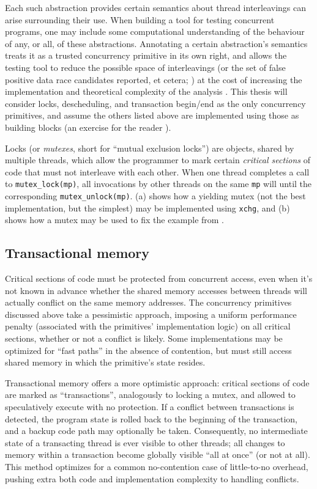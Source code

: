 Each such abstraction provides certain semantics about  thread interleavings can arise surrounding their use.
When building a tool for testing concurrent programs,
one may include some computational understanding of the behaviour of any, or all, of these abstractions.
Annotating a certain abstraction's semantics treats it as a trusted concurrency primitive in its own right,
and allows the testing tool to reduce the possible space of interleavings
(or the set of false positive data race candidates reported, et cetera;
)
at the cost of increasing the implementation and theoretical complexity of the analysis
.
This thesis will consider locks, descheduling, and transaction begin/end as the only concurrency primitives,
and assume the others listed above are implemented using those as building blocks (an exercise for the reader \cite{thrlib}).

Locks (or {\em mutexes}, short for ``mutual exclusion locks'') are objects, shared by multiple threads, which allow the programmer to mark certain {\em critical sections} of code that must not interleave with each other.
When one thread completes a call to {\tt mutex\_lock(mp)}, all invocations by other threads on the same {\tt mp}
will  until the corresponding {\tt mutex\_unlock(mp)}.
(a) shows how a yielding mutex (not the best implementation, but the simplest) may be implemented using {\tt xchg},
and (b) shows how a mutex may be used to fix the example from .


\subsection{Transactional memory}
\label{sec:overview-tm}

Critical sections of code must be protected from concurrent access, even when it's not known in advance whether the shared memory accesses between threads will actually conflict on the same memory addresses.
The concurrency primitives discussed above take a pessimistic approach, imposing a uniform performance penalty (associated with the primitives' implementation logic) on all critical sections, whether or not a conflict is likely.
Some implementations may be optimized for ``fast paths'' in the absence of contention, but must still access shared memory in which the primitive's state resides.

Transactional memory \cite{transactional-memory} offers a more optimistic approach: critical sections of code are marked as ``transactions'', analogously to locking a mutex, and allowed to speculatively execute with no protection.
If a conflict between transactions is detected, the program state is rolled back to the beginning of the transaction, and a backup code path may optionally be taken.
Consequently, no intermediate state of a transacting thread is ever visible to other threads; all changes to memory within a transaction become globally visible ``all at once'' (or not at all).
This method optimizes for a common no-contention case of little-to-no overhead, pushing extra both code and implementation complexity to handling conflicts.


